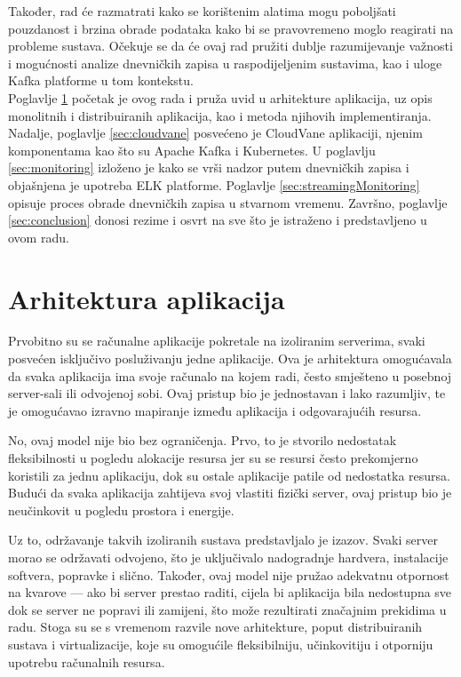 \documentclass[times, utf8, diplomski]{fer}
\begin{document}
Također, rad će razmatrati kako se korištenim alatima mogu poboljšati pouzdanost i brzina obrade podataka kako bi se pravovremeno moglo reagirati na probleme sustava. Očekuje se da će ovaj rad pružiti dublje razumijevanje važnosti i mogućnosti analize dnevničkih zapisa u raspodijeljenim sustavima, kao i uloge Kafka platforme u tom kontekstu.\\

Poglavlje \ref{sec:app_arch} početak je ovog rada i pruža uvid u arhitekture aplikacija, uz opis monolitnih i distribuiranih aplikacija, kao i metoda njihovih implementiranja. Nadalje, poglavlje \ref{sec:cloudvane} posvećeno je CloudVane aplikaciji, njenim komponentama kao što su Apache Kafka i Kubernetes. U poglavlju \ref{sec:monitoring} izloženo je kako se vrši nadzor putem dnevničkih zapisa i objašnjena je upotreba ELK platforme. Poglavlje \ref{sec:streamingMonitoring} opisuje proces obrade dnevničkih zapisa u stvarnom vremenu. Završno, poglavlje \ref{sec:conclusion} donosi rezime i osvrt na sve što je istraženo i predstavljeno u ovom radu.

\chapter{Arhitektura aplikacija}
\label{sec:app_arch}

Prvobitno su se računalne aplikacije pokretale na izoliranim serverima, svaki posvećen isključivo posluživanju jedne aplikacije. Ova je arhitektura omogućavala da svaka aplikacija ima svoje računalo na kojem radi, često smješteno u posebnoj server-sali ili odvojenoj sobi. Ovaj pristup bio je jednostavan i lako razumljiv, te je omogućavao izravno mapiranje između aplikacija i odgovarajućih resursa. 

No, ovaj model nije bio bez ograničenja. Prvo, to je stvorilo nedostatak fleksibilnosti u pogledu alokacije resursa jer su se resursi često prekomjerno koristili za jednu aplikaciju, dok su ostale aplikacije patile od nedostatka resursa. Budući da svaka aplikacija zahtijeva svoj vlastiti fizički server, ovaj pristup bio je neučinkovit u pogledu prostora i energije.

Uz to, održavanje takvih izoliranih sustava predstavljalo je izazov. Svaki server morao se održavati odvojeno, što je uključivalo nadogradnje hardvera, instalacije softvera, popravke i slično. Također, ovaj model nije pružao adekvatnu otpornost na kvarove --- ako bi server prestao raditi, cijela bi aplikacija bila nedostupna sve dok se server ne popravi ili zamijeni, što može rezultirati značajnim prekidima u radu.
Stoga su se s vremenom razvile nove arhitekture, poput distribuiranih sustava i virtualizacije, koje su omogućile fleksibilniju, učinkovitiju i otporniju upotrebu računalnih resursa.\\
\end{document}
